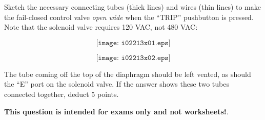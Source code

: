 

Sketch the necessary connecting tubes (thick lines) and wires (thin lines) to make the fail-closed control valve {\it open wide} when the ``TRIP'' pushbutton is pressed.  Note that the solenoid valve requires 120 VAC, not 480 VAC:

$$\texttt{[image: i02213x01.eps]}$$







$$\texttt{[image: i02213x02.eps]}$$

The tube coming off the top of the diaphragm should be left vented, as should the ``E'' port on the solenoid valve.  If the answer shows these two tubes connected together, deduct 5 points.







{\bf This question is intended for exams only and not worksheets!}.



